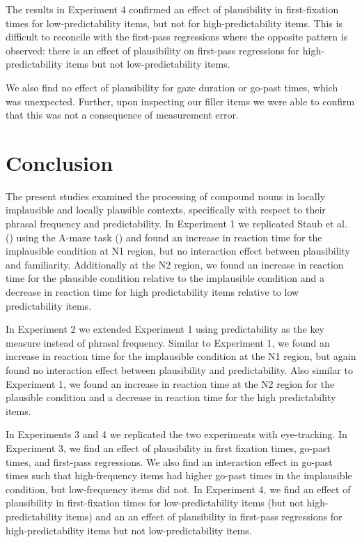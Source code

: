 \documentclass[
  12pt,
  letterpaper,
]{scrreprt}
\begin{document}
The results in Experiment 4 confirmed an effect of plausibility in
first-fixation times for low-predictability items, but not for
high-predictability items. This is difficult to reconcile with the
first-pass regressions where the opposite pattern is observed: there is
an effect of plausibility on first-pass regressions for
high-predictability items but not low-predictability items.

We also find no effect of plausibility for gaze duration or go-past
times, which was unexpected. Further, upon inspecting our filler items
we were able to confirm that this was not a consequence of measurement
error.

\section{Conclusion}\label{conclusion}

The present studies examined the processing of compound nouns in locally
implausible and locally plausible contexts, specifically with respect to
their phrasal frequency and predictability. In Experiment 1 we
replicated Staub et al.
() using the A-maze
task () and
found an increase in reaction time for the implausible condition at N1
region, but no interaction effect between plausibility and familiarity.
Additionally at the N2 region, we found an increase in reaction time for
the plausible condition relative to the implausible condition and a
decrease in reaction time for high predictability items relative to low
predictability items.

In Experiment 2 we extended Experiment 1 using predictability as the key
measure instead of phrasal frequency. Similar to Experiment 1, we found
an increase in reaction time for the implausible condition at the N1
region, but again found no interaction effect between plausibility and
predictability. Also similar to Experiment 1, we found an increase in
reaction time at the N2 region for the plausible condition and a
decrease in reaction time for the high predictability items.

In Experiments 3 and 4 we replicated the two experiments with
eye-tracking. In Experiment 3, we find an effect of plausibility in
first fixation times, go-past times, and first-pass regressions. We also
find an interaction effect in go-past times such that high-frequency
items had higher go-past times in the implausible condition, but
low-frequency items did not. In Experiment 4, we find an effect of
plausibility in first-fixation times for low-predictability items (but
not high-predictability items) and an an effect of plausibility in
first-pass regressions for high-predictability items but not
low-predictability items.
\end{document}
